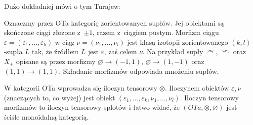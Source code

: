 Dużo dokładniej mówi o tym Turajew:

\begin{proposition}
    Oznaczmy przez OTa kategorię zorientowanych supłów.
    Jej obiektami są skończone ciągi złożone z~$\pm 1$, razem z~ciągiem pustym.
    Morfizm ciągu $\varepsilon = (\varepsilon_1, \ldots, \varepsilon_k)$ w ciąg $\nu = (\nu_1, \ldots, \nu_l)$ jest klasą izotopii zorientowanego $(k, l)$-supła $L$ tak, że źródłem $L$ jest $\varepsilon$, zaś celem $\nu$.
    Na przykład supły $\curvearrowright$, $\curvearrowleft$ oraz $X_+$ opisane są przez morfizmy $\varnothing \to (-1, 1)$, $\varnothing \to (1, -1)$ oraz $(1, 1) \to (1, 1)$.
    Składanie morfizmów odpowiada mnożeniu supłów.

    W kategorii OTa wprowadza się iloczyn tensorowy $\otimes$. Iloczynem obiektów $\varepsilon, \nu$ (znaczących to, co wyżej) jest obiekt $(\varepsilon_1, \ldots, \varepsilon_k, \nu_1, \ldots, \nu_l)$.
    Iloczyn tensorowy morfizmów to iloczyn tensorowy splotów i łatwo widać, że $(OTa, \otimes, \varnothing)$ jest ściśle monoidalną kategorią.


\end{proposition}
